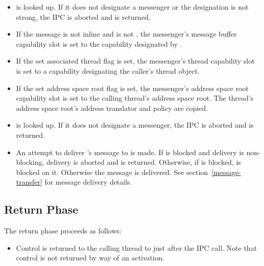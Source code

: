 \begin{itemize}

\item {} is looked up.  If it does not designate a
  messenger or the designation is not strong, the IPC is aborted and
   is returned.

\item If the message is not inline and  is not
  , the messenger's message buffer capability slot
  is set to the capability designated by .

\item If the set associated thread flag is set, the messenger's thread
  capability slot is set to a capability designating the caller's
  thread object.

\item If the set address space root flag is set, the messenger's
  address space root capability slot is set to the calling thread's
  address space root.  The thread's address space root's address
  translator and policy are copied.

\item {} is looked up.  If it does not designate a
  messenger, the IPC is aborted and  is returned.

\item An attempt to deliver 's message to
   is made.  If  is
  blocked and delivery is non-blocking, delivery is aborted and
   is returned.  Otherwise, if 
  is blocked,  is blocked on it.  Otherwise the
  message is delivered.  See section~\ref{message-transfer} for
  message delivery details.

\end{itemize}

\subsection{Return Phase}

The return phase proceeds as follows:

\begin{itemize}
\item Control is returned to the calling thread to just after the IPC
  call.  Note that control is not returned by way of an activation.
\end{itemize}


